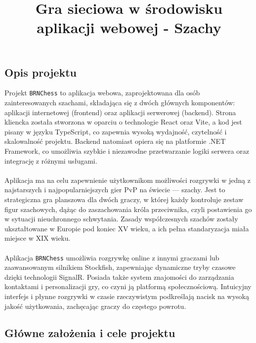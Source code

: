 \documentclass[twoside]{projektInzynierskiMS1}
\title{Gra sieciowa w środowisku aplikacji webowej - Szachy}
\begin{document}

\subsection{Opis projektu}

\noindent
Projekt \texttt{BRNChess} to aplikacja webowa, zaprojektowana dla osób zainteresowanych szachami, składająca się z dwóch głównych komponentów: aplikacji internetowej (frontend) oraz aplikacji serwerowej (backend). Strona kliencka została stworzona w oparciu o technologie React oraz Vite, a kod jest pisany w języku TypeScript, co zapewnia wysoką wydajność, czytelność i skalowalność projektu. Backend natomiast opiera się na platformie .NET Framework, co umożliwia szybkie i niezawodne przetwarzanie logiki serwera oraz integrację z różnymi usługami.
\\\\
Aplikacja ma na celu zapewnienie użytkownikom możliwości rozgrywki w jedną z najstarszych i najpopularniejszych gier PvP na świecie — szachy. Jest to strategiczna gra planszowa dla dwóch graczy, w której każdy kontroluje zestaw figur szachowych, dążąc do zaszachowania króla przeciwnika, czyli postawienia go w sytuacji nieuchronnego schwytania. Zasady współczesnych szachów zostały ukształtowane w Europie pod koniec XV wieku, a ich pełna standaryzacja miała miejsce w XIX wieku.
\\\\
Aplikacja \texttt{BRNChess} umożliwia rozgrywkę online z innymi graczami lub zaawansowanym silnikiem Stockfish, zapewniając dynamiczne tryby czasowe dzięki technologii SignalR. Posiada także system znajomości do zarządzania kontaktami i personalizacji gry, co czyni ją platformą społecznościową. Intuicyjny interfejs i płynne rozgrywki w czasie rzeczywistym podkreślają nacisk na wysoką jakość użytkowania, zachęcając graczy do częstego powrotu.

\newpage

\subsection{Główne założenia i cele projektu}
\end{document}
